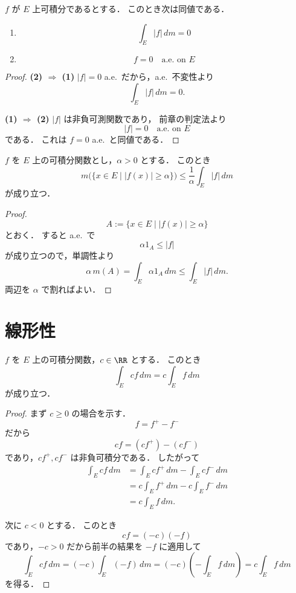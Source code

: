 \begin{proposition}
$f$ が $E$ 上可積分であるとする．
このとき次は同値である．
\begin{enumerate}
    \item
    \[
    \int_E |f|\,dm=0
    \]
    \item
    \[
    f=0 \quad \text{a.e.\ on } E
    \]
\end{enumerate}
\end{proposition}
\begin{proof}
\textbf{(2) $\Rightarrow$ (1)}\quad
$|f|=0$ a.e.\ だから，a.e.\ 不変性より
\[
\int_E |f|\,dm=0.
\]

\textbf{(1) $\Rightarrow$ (2)}\quad
$|f|$ は非負可測関数であり，
前章の判定法より
\[
|f|=0 \quad \text{a.e.\ on } E
\]
である．
これは $f=0$ a.e.\ と同値である．
\end{proof}

\begin{proposition}[Chebyshev不等式]
$f$ を $E$ 上の可積分関数とし，$\alpha>0$ とする．
このとき
\[
m\bigl(\{x \in E \mid |f(x)|\ge \alpha\}\bigr)
\le
\frac{1}{\alpha}\int_E |f|\,dm
\]
が成り立つ．
\end{proposition}
\begin{proof}
\[
A:=\{x \in E \mid |f(x)|\ge \alpha\}
\]
とおく．
すると a.e.\ で
\[
\alpha 1_A\le |f|
\]
が成り立つので，単調性より
\[
\alpha\,m(A)
=
\int_E \alpha 1_A\,dm
\le
\int_E |f|\,dm.
\]
両辺を $\alpha$ で割ればよい．
\end{proof}

\section{線形性}

\begin{proposition}[斉次性]
$f$ を $E$ 上の可積分関数，$c \in \RR$ とする．
このとき
\[
\int_E cf\,dm
=
c\int_E f\,dm
\]
が成り立つ．
\end{proposition}
\begin{proof}
まず $c\ge 0$ の場合を示す．
\[
f=f^+-f^-
\]
だから
\[
cf=(cf^+)-(cf^-)
\]
であり，$cf^+,cf^-$ は非負可積分である．
したがって
\begin{align*}
\int_E cf\,dm
&=
\int_E cf^+\,dm-\int_E cf^-\,dm \\
&=
c\int_E f^+\,dm-c\int_E f^-\,dm \\
&=
c\int_E f\,dm.
\end{align*}

次に $c<0$ とする．
このとき
\[
cf=(-c)(-f)
\]
であり，$-c>0$ だから前半の結果を $-f$ に適用して
\[
\int_E cf\,dm
=
(-c)\int_E (-f)\,dm
=
(-c)\left(-\int_E f\,dm\right)
=
c\int_E f\,dm
\]
を得る．
\end{proof}

